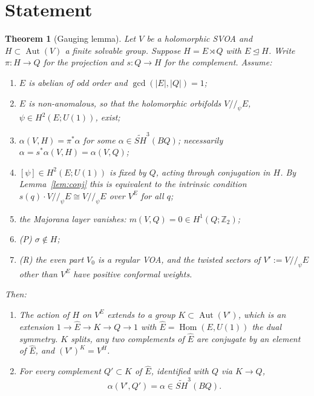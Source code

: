 \documentclass[11pt]{article}
\newtheorem{theorem}{Theorem}[section]
\theoremstyle{definition}
\newcommand{\Hom}{\operatorname{Hom}}
\newcommand{\Aut}{\operatorname{Aut}}
\newcommand{\SH}{\widetilde{SH}}
\newcommand{\Z}{\mathbb Z}
\newcommand{\Ehat}{\widehat E}
\begin{document}
\section{Statement}\label{sec:statement}

\begin{theorem}[Gauging lemma]\label{thm:main}
Let $V$ be a holomorphic SVOA and $H\subset\Aut(V)$ a finite solvable group. Suppose $H=E\rtimes Q$
with $E\trianglelefteq H$. Write $\pi:H\to Q$ for the projection and $s:Q\to H$ for the complement.
Assume:
\begin{enumerate}[label=(\arabic*),start=0]
\item $E$ is abelian of odd order and $\gcd(|E|,|Q|)=1$;
\item $E$ is non-anomalous, so that the holomorphic orbifolds $V/\!/_\psi E$, $\psi\in H^2(E;U(1))$,
  exist;
\item $\alpha(V,H)=\pi^*\alpha$ for some $\alpha\in\SH^3(BQ)$; necessarily $\alpha=s^*\alpha(V,H)=\alpha(V,Q)$;
\item $[\psi]\in H^2(E;U(1))$ is fixed by $Q$, acting through conjugation in $H$. By
Lemma~\ref{lem:conj} this is equivalent to the intrinsic condition $s(q)\cdot V/\!/_\psi E\cong
V/\!/_\psi E$ over $V^E$ for all $q$;
\item the Majorana layer vanishes: $m(V,Q)=0\in H^1(Q;\Z_2)$;
\item \textup{(P)} $\sigma\notin H$;
\item \textup{(R)} the even part $V_0$ is a regular VOA, and the twisted sectors of
  $V':=V/\!/_\psi E$ other than $V^E$ have positive conformal weights.
\end{enumerate}
Then:
\begin{enumerate}[label=(\roman*)]
\item The action of $H$ on $V^E$ extends to a group $K\subset\Aut(V')$, which is an extension
  $1\to\Ehat\to K\to Q\to1$ with $\Ehat=\Hom(E,U(1))$ the dual symmetry. $K$ splits, any two
  complements of $\Ehat$ are conjugate by an element of $\Ehat$, and $(V')^K=V^H$.
\item For every complement $Q'\subset K$ of $\Ehat$, identified with $Q$ via $K\to Q$,
  \[\alpha(V',Q')=\alpha\in\SH^3(BQ).\]
\end{enumerate}
\end{theorem}
\end{document}

